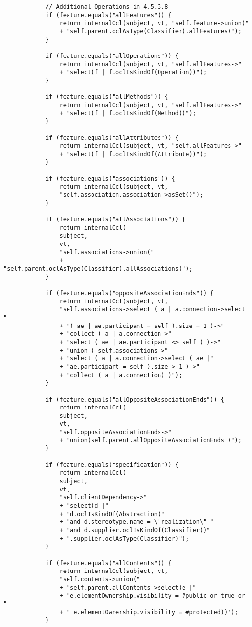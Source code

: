 \begin{mdframed}
\begin{lstlisting}
			// Additional Operations in 4.5.3.8
			if (feature.equals("allFeatures")) {
				return internalOcl(subject, vt, "self.feature->union("
				+ "self.parent.oclAsType(Classifier).allFeatures)");
			}
			
			if (feature.equals("allOperations")) {
				return internalOcl(subject, vt, "self.allFeatures->"
				+ "select(f | f.oclIsKindOf(Operation))");
			}
			
			if (feature.equals("allMethods")) {
				return internalOcl(subject, vt, "self.allFeatures->"
				+ "select(f | f.oclIsKindOf(Method))");
			}
			
			if (feature.equals("allAttributes")) {
				return internalOcl(subject, vt, "self.allFeatures->"
				+ "select(f | f.oclIsKindOf(Attribute))");
			}
			
			if (feature.equals("associations")) {
				return internalOcl(subject, vt, 
				"self.association.association->asSet()");
			}
			
			if (feature.equals("allAssociations")) {
				return internalOcl(
				subject,
				vt,
				"self.associations->union("
				+ "self.parent.oclAsType(Classifier).allAssociations)");
			}
			
			if (feature.equals("oppositeAssociationEnds")) {
				return internalOcl(subject, vt,
				"self.associations->select ( a | a.connection->select "
				+ "( ae | ae.participant = self ).size = 1 )->"
				+ "collect ( a | a.connection->"
				+ "select ( ae | ae.participant <> self ) )->"
				+ "union ( self.associations->"
				+ "select ( a | a.connection->select ( ae |"
				+ "ae.participant = self ).size > 1 )->"
				+ "collect ( a | a.connection) )");
			}
			
			if (feature.equals("allOppositeAssociationEnds")) {
				return internalOcl(
				subject,
				vt,
				"self.oppositeAssociationEnds->"
				+ "union(self.parent.allOppositeAssociationEnds )");
			}                 
			
			if (feature.equals("specification")) {
				return internalOcl(
				subject,
				vt,
				"self.clientDependency->"
				+ "select(d |"
				+ "d.oclIsKindOf(Abstraction)"
				+ "and d.stereotype.name = \"realization\" "
				+ "and d.supplier.oclIsKindOf(Classifier))"
				+ ".supplier.oclAsType(Classifier)");
			}                 
			
			if (feature.equals("allContents")) {
				return internalOcl(subject, vt,
				"self.contents->union("
				+ "self.parent.allContents->select(e |"
				+ "e.elementOwnership.visibility = #public or true or "
				+ " e.elementOwnership.visibility = #protected))");
			}                 
			

\end{lstlisting}
\end{mdframed}
